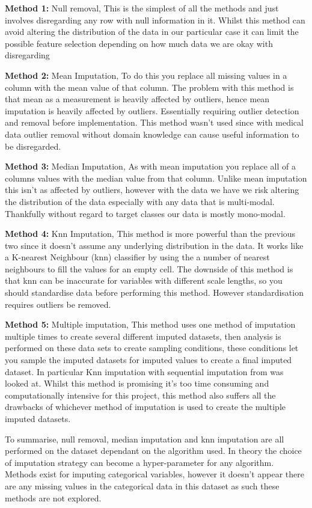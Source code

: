 \documentclass[a4paper]{article}
\begin{document}
\textbf{Method 1:} Null removal, This is the simplest of all the methods and just involves disregarding any row with null information in it. Whilst this method can avoid altering the distribution of the data in our particular case it can limit the possible feature selection depending on how much data we are okay with disregarding 

\textbf{Method 2:} Mean Imputation, To do this you replace all missing values in a column with the mean value of that column. The problem with this method is that mean as a measurement is heavily affected by outliers, hence mean imputation is heavily affected by outliers. Essentially requiring outlier detection and removal before implementation. This method wasn't used since with medical data outlier removal without domain knowledge can cause useful information to be disregarded.

\textbf{Method 3:} Median Imputation, As with mean imputation you replace all of a columns values with the median value from that column. Unlike mean imputation this isn't as affected by outliers, however with the data we have we risk altering the distribution of the data especially with any data that is multi-modal. Thankfully without regard to target classes our data is mostly mono-modal. 

\textbf{Method 4:} Knn Imputation, This method is more powerful than the previous two since it doesn't assume any underlying distribution in the data. It works like a K-nearest Neighbour (knn) classifier by using the a number of nearest neighbours to fill the values for an empty cell. The downside of this method is that knn can be inaccurate for variables with different scale lengths, so you should standardise data before performing this method. However standardisation requires outliers be removed. 

\textbf{Method 5:} Multiple imputation, This method uses one method of imputation multiple times to create several different imputed datasets, then analysis is performed on these data sets to create sampling conditions, these conditions let you sample the imputed datasets for imputed values to create a final imputed dataset. In particular Knn imputation with sequential imputation from \cite{faisal2021multiple} was looked at. Whilst this method is promising it's too time consuming and computationally intensive for this project, this method also suffers all the drawbacks of whichever method of imputation is used to create the multiple imputed datasets. 

To summarise, null removal, median imputation and knn imputation are all performed on the dataset dependant on the algorithm used. In theory the choice of imputation strategy can become a hyper-parameter for any algorithm. Methods exist for imputing categorical variables, however it doesn't appear there are any missing values in the categorical data in this dataset as such these methods are not explored.
\end{document}
